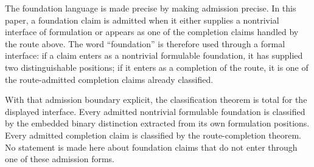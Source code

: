 \documentclass[11pt]{article}
\begin{document}
The foundation language is made precise by making admission precise.  In
this paper, a foundation claim is admitted when it either supplies a
nontrivial interface of formulation or appears as one of the completion
claims handled by the route above.  The word ``foundation'' is therefore
used through a formal interface: if a claim enters as a nontrivial
formulable foundation, it has supplied two distinguishable positions; if
it enters as a completion of the route, it is one of the route-admitted
completion claims already classified.

With that admission boundary explicit, the classification theorem is
total for the displayed interface.  Every admitted nontrivial formulable
foundation is classified by the embedded binary distinction extracted
from its own formulation positions.  Every admitted completion claim is
classified by the route-completion theorem.  No statement is made here
about foundation claims that do not enter through one of these admission
forms.
\end{document}
